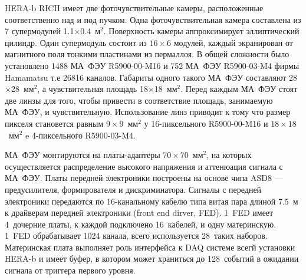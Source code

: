 

HERA-b RICH имеет две фоточувствительные камеры, расположенные соответственно над и под пучком. Одна фоточувствительная камера составлена из 7 супермодулей 1.1$\times$0.4~м$^2$. Поверхность камеры аппроксимирует эллиптический цилиндр. Один супермодуль состоит из $16 \times 6$ модулей, каждый экранирован от магнитного поля тонкими пластинами из пермаллоя. В общей сложности было установлено 1488 МА~ФЭУ R5900-00-M16 и 752 МА~ФЭУ R5900-03-M4 фирмы Hamamatsu т.е 26816 каналов. Габариты одного такого МА~ФЭУ составляют 28$\times$28~мм$^2$, а чувствительная площадь 18$\times$18~мм$^2$. Перед каждым МА~ФЭУ стоят две линзы для того, чтобы привести в соответствие площадь, занимаемую МА~ФЭУ, и чувствительную. Использование линз приводит к тому что размер пикселя становется равным $9 \times 9$~мм$^2$ у 16-пиксельного R5900-00-M16 и $18 \times 18$~мм$^2$ e 4-пиксельного R5900-03-M4.

МА~ФЭУ монтируются на платы-адаптеры $70 \times 70$~мм$^2$, на которых осуществляется распределение высокого напряжения и аттенюация сигнала с МА~ФЭУ. Платы передней электроники построены на основе чипа ASD8 --- предусилителя, формирователя и дискриминатора. Сигналы с передней электроники передаются по 16-канальному кабелю типа витая пара длиной 7.5~м к драйверам передней электроники (front end dirver, FED). 1~FED имеет 4~дочерние платы, к каждой подключено 16~кабелей, и одну материнскую. 1~FED обрабатывает 1024 канала, всего используется 28~таких наборов. Материнская плата выполняет роль интерфейса к DAQ системе всегй установки HERA-b и имеет буфер, в котором может храниться до 128~событий в ожидании сигнала от триггера первого уровня.


